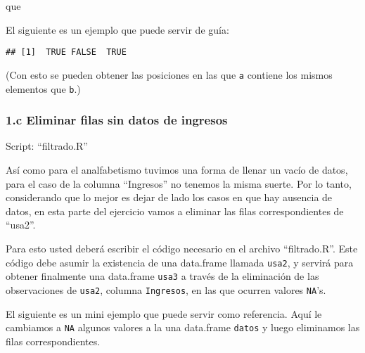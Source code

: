 \documentclass[]{article}
\newenvironment{Shaded}{}{}
\newcommand{\KeywordTok}[1]{\textcolor[rgb]{0.00,0.44,0.13}{\textbf{{#1}}}}
\newcommand{\StringTok}[1]{\textcolor[rgb]{0.25,0.44,0.63}{{#1}}}
\newcommand{\NormalTok}[1]{{#1}}
\begin{document}
\begin{Shaded}
\end{Shaded}
que

\begin{Shaded}
\end{Shaded}
El siguiente es un ejemplo que puede servir de guía:

\begin{Shaded}
\end{Shaded}
\begin{verbatim}
## [1]  TRUE FALSE  TRUE
\end{verbatim}
(Con esto se pueden obtener las posiciones en las que \texttt{a}
contiene los mismos elementos que \texttt{b}.)

\subsubsection{1.c Eliminar filas sin datos de ingresos}

Script: ``filtrado.R''

Así como para el analfabetismo tuvimos una forma de llenar un vacío de
datos, para el caso de la columna ``Ingresos'' no tenemos la misma
suerte. Por lo tanto, considerando que lo mejor es dejar de lado los
casos en que hay ausencia de datos, en esta parte del ejercicio vamos a
eliminar las filas correspondientes de ``usa2''.

Para esto usted deberá escribir el código necesario en el archivo
``filtrado.R''. Este código debe asumir la existencia de una data.frame
llamada \texttt{usa2}, y servirá para obtener finalmente una data.frame
\texttt{usa3} a través de la eliminación de las observaciones de
\texttt{usa2}, columna \texttt{Ingresos}, en las que ocurren valores
\texttt{NA}'s.

El siguiente es un mini ejemplo que puede servir como referencia. Aquí
le cambiamos a \texttt{NA} algunos valores a la una data.frame
\texttt{datos} y luego eliminamos las filas correspondientes.
\end{document}
